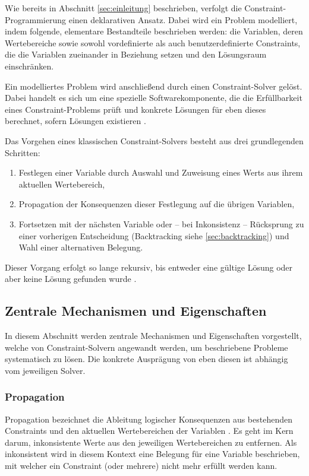 \documentclass[12pt,a4paper]{article}
\begin{document}
Wie bereits in Abschnitt \ref{sec:einleitung} beschrieben, verfolgt die Constraint-Programmierung einen deklarativen Ansatz.
Dabei wird ein Problem modelliert, indem folgende, elementare Bestandteile beschrieben werden: die Variablen, deren Wertebereiche sowie sowohl vordefinierte als auch benutzerdefinierte Constraints, die die Variablen zueinander in Beziehung setzen und den Lösungsraum einschränken.

Ein modelliertes Problem wird anschließend durch einen Constraint-Solver gelöst.
Dabei handelt es sich um eine spezielle Softwarekomponente, die die Erfüllbarkeit eines Constraint-Problems prüft und konkrete Lösungen für eben dieses berechnet, sofern Lösungen existieren \cite{drt,clp_book2}.

\noindent
Das Vorgehen eines klassischen Constraint-Solvers besteht aus drei grundlegenden Schritten:
\begin{enumerate}
    \item Festlegen einer Variable durch Auswahl und Zuweisung eines Werts aus ihrem aktuellen Wertebereich,
    \item Propagation der Konsequenzen dieser Festlegung auf die übrigen Variablen,
    \item Fortsetzen mit der nächsten Variable oder -- bei Inkonsistenz -- Rücksprung zu einer vorherigen Entscheidung (Backtracking siehe \ref{sec:backtracking}) und Wahl einer alternativen Belegung.
\end{enumerate}
Dieser Vorgang erfolgt so lange rekursiv, bis entweder eine gültige Lösung oder aber keine Lösung gefunden wurde \cite{clp_book2}.
\subsection{Zentrale Mechanismen und Eigenschaften}
In diesem Abschnitt werden zentrale Mechanismen und Eigenschaften vorgestellt, welche von Constraint-Solvern angewandt werden, um beschriebene Probleme systematisch zu lösen. 
Die konkrete Ausprägung von eben diesen ist abhängig vom jeweiligen Solver.
\subsubsection{Propagation}
Propagation bezeichnet die Ableitung logischer Konsequenzen aus bestehenden Constraints und den aktuellen Wertebereichen der Variablen \cite{clp92}.
Es geht im Kern darum, inkonsistente Werte aus den jeweiligen Wertebereichen zu entfernen.
Als \glqq inkonsistent\grqq{} wird in diesem Kontext eine Belegung für eine Variable beschrieben, mit welcher ein Constraint (oder mehrere) nicht mehr erfüllt werden kann.
\end{document}
